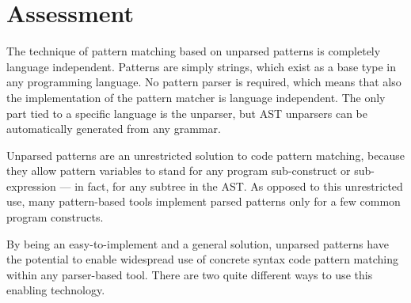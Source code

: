 \documentclass{sigplanconf}
\begin{document}
\section{Assessment}
\label{assess}
The technique of pattern matching based on unparsed patterns is
completely language independent. Patterns are simply strings, which
exist as a base type in any programming language. No pattern parser is
required, which means that also the implementation of the pattern
matcher is language independent. The only part tied to a specific
language is the unparser, but AST unparsers can be automatically
generated from any grammar.


Unparsed patterns are an unrestricted solution to code pattern
matching, because they allow pattern variables to stand for any
program sub-construct or sub-expression --- in fact, for any subtree
in the AST. 
As opposed to this
unrestricted use, many pattern-based tools implement parsed patterns
only for a few common program constructs.

By being an easy-to-implement and a general solution, unparsed
patterns have the potential to enable widespread use of concrete
syntax code pattern matching within any parser-based tool. There are
two quite different ways to use this enabling technology.
\end{document}
